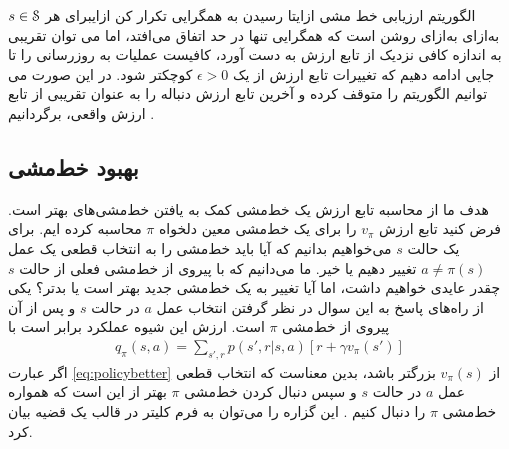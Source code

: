 {الگوریتم ارزیابی خط مشی}
‌ازای{تا رسیدن به همگرایی تکرار کن}
‌ازای{برای هر $s \in \EuScript{S}$}
‌به‌ازای
‌به‌ازای
روشن است که همگرایی تنها در حد اتفاق می‌افتد، اما می توان تقریبی به اندازه کافی نزدیک از تابع ارزش به دست آورد، کافیست عملیات به روزرسانی را تا جایی ادامه دهیم که تغییرات تابع ارزش از یک
$\epsilon > 0$
کوچکتر شود. در این صورت می توانیم الگوریتم را متوقف کرده و آخرین تابع ارزش دنباله را به عنوان تقریبی از تابع ارزش واقعی، برگردانیم \cite{suttonbook}.

% 
%

\subsection{بهبود خط‌مشی}

هدف ما از محاسبه تابع ارزش یک خط‌مشی کمک به یافتن خط‌مشی‌های بهتر است.
فرض کنید تابع ارزش 
$v_{\pi}$
 را برای یک خط‌مشی معین  دلخواه 
 $\pi$
  محاسبه کرده ایم. برای یک حالت 
  $s$
 می‌خواهیم بدانیم که آیا باید خط‌مشی را به انتخاب قطعی یک عمل 
 $a \neq \pi(s)$
  تغییر دهیم یا خیر.
ما می‌دانیم که با پیروی از خط‌مشی فعلی از حالت
 $s$
  چقدر عایدی خواهیم داشت، اما آیا تغییر به یک خط‌مشی جدید بهتر است یا بدتر؟
  یکی از راه‌های پاسخ به این سوال در نظر گرفتن انتخاب عمل  
  $a$
در حالت 
$s$
و پس از آن پیروی از خط‌مشی
$\pi$
 است. 
 ارزش این شیوه عملکرد برابر است با
 \begin{align}
q_\pi(s,a) = \sum_{s',r} p(s',r|s,a)\left[r + \gamma v_\pi(s')\right]	
 	\label{eq:policybetter}
 \end{align}
 اگر عبارت 
 \ref{eq:policybetter}
 از $v_\pi(s)$ بزرگتر باشد، بدین معناست که انتخاب قطعی عمل $a$ در حالت $s$ و سپس دنبال کردن خط‌مشی $\pi$ بهتر از این است که همواره خط‌مشی $\pi$ را دنبال کنیم \cite{suttonbook}. این گزاره را می‌توان به فرم کلی\nf تر در قالب یک قضیه بیان کرد.

